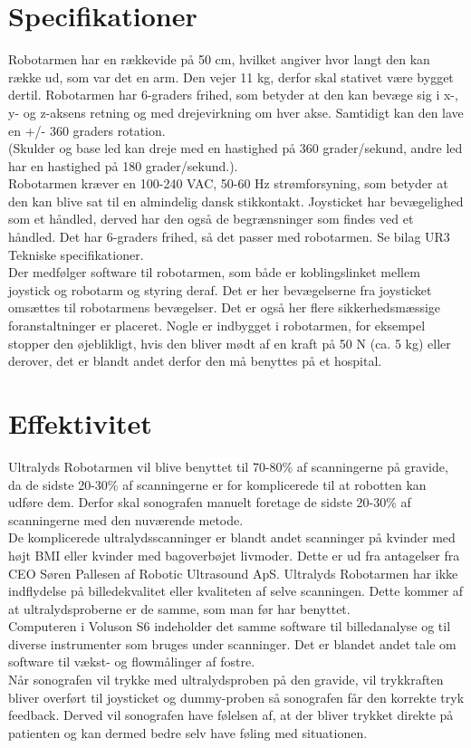 \section{Specifikationer}
Robotarmen har en rækkevide på 50 cm, hvilket angiver hvor langt den kan række ud, som var det en arm. Den vejer 11 kg, derfor skal stativet være bygget dertil. Robotarmen har 6-graders frihed, som betyder at den kan bevæge sig i x-, y- og z-aksens retning og med drejevirkning om hver akse. Samtidigt kan den lave en +/- 360 graders rotation. \\
(Skulder og base led kan dreje med en hastighed på 360 grader/sekund,  andre led har en hastighed på 180 grader/sekund.). \\
Robotarmen kræver en 100-240 VAC, 50-60 Hz strømforsyning, som betyder at den kan blive sat til en almindelig dansk stikkontakt. 
\newline 
Joysticket har bevægelighed som et håndled, derved har den også de begrænsninger som findes ved et håndled. Det har 6-graders frihed, så det passer med robotarmen. Se bilag UR3 Tekniske specifikationer. \\

Der medfølger software til robotarmen, som både er koblingslinket mellem joystick og robotarm og styring deraf. Det er her bevægelserne fra joysticket omsættes til robotarmens bevægelser. Det er også her flere sikkerhedsmæssige foranstaltninger er placeret. Nogle er indbygget i robotarmen, for eksempel stopper den øjeblikligt, hvis den bliver mødt af en kraft på 50 N (ca. 5 kg) eller derover, det er blandt andet derfor den må benyttes på et hospital.    

\section{Effektivitet}
Ultralyds Robotarmen vil blive benyttet til 70-80\% af scanningerne på gravide, da de sidste 20-30\% af scanningerne er for komplicerede til at robotten kan udføre dem. Derfor skal sonografen manuelt foretage de sidste 20-30\% af scanningerne med den nuværende metode. \\ 
De komplicerede ultralydsscanninger er blandt andet scanninger på kvinder med højt BMI eller kvinder med bagoverbøjet livmoder. Dette er ud fra antagelser fra CEO Søren Pallesen af Robotic Ultrasound ApS. 
\newline 
Ultralyds Robotarmen har ikke indflydelse på billedekvalitet eller kvaliteten af selve scanningen. Dette kommer af at ultralydsproberne er de samme, som man før har benyttet. \\Computeren i Voluson S6 indeholder det samme software til billedanalyse og til diverse instrumenter som bruges under scanninger. Det er blandet andet tale om software til vækst- og flowmålinger af fostre.   \\
Når sonografen vil trykke med ultralydsproben på den gravide, vil trykkraften bliver overført til joysticket og dummy-proben så sonografen får den korrekte tryk feedback. Derved vil sonografen have følelsen af, at der bliver trykket direkte på patienten og kan dermed bedre selv have føling med situationen. 
